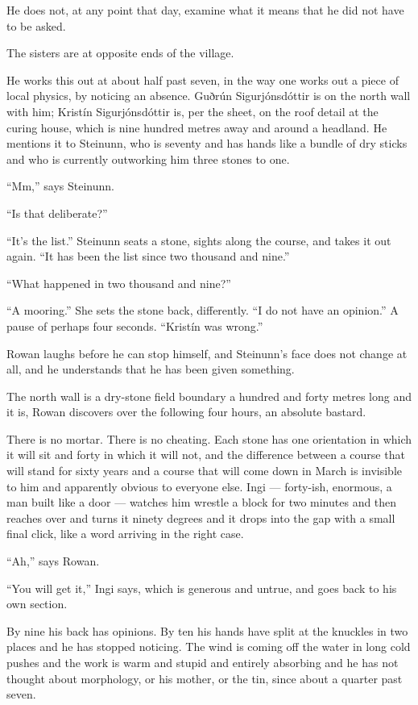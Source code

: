 \documentclass[11pt,oneside]{book}
\newcommand{\sceneline}{%
  \par\vspace{1.2em}
  \begin{center}
    \fontsize{11}{11}\selectfont \textbullet\quad\textbullet\quad\textbullet
  \end{center}
  \vspace{0.6em}\noindent\ignorespaces
}
\begin{document}
He does not, at any point that day, examine what it means that he did
not have to be asked.

\sceneline

The sisters are at opposite ends of the village.

He works this out at about half past seven, in the way one works out a
piece of local physics, by noticing an absence. Guðrún Sigurjónsdóttir
is on the north wall with him; Kristín Sigurjónsdóttir is, per the
sheet, on the roof detail at the curing house, which is nine hundred
metres away and around a headland. He mentions it to Steinunn, who is
seventy and has hands like a bundle of dry sticks and who is currently
outworking him three stones to one.

``Mm,'' says Steinunn.

``Is that deliberate?''

``It's the list.'' Steinunn seats a stone, sights along the course, and
takes it out again. ``It has been the list since two thousand and
nine.''

``What happened in two thousand and nine?''

``A mooring.'' She sets the stone back, differently. ``I do not have an
opinion.'' A pause of perhaps four seconds. ``Kristín was wrong.''

Rowan laughs before he can stop himself, and Steinunn's face does not
change at all, and he understands that he has been given something.

\sceneline

The north wall is a dry-stone field boundary a hundred and forty metres
long and it is, Rowan discovers over the following four hours, an
absolute bastard.

There is no mortar. There is no cheating. Each stone has one orientation
in which it will sit and forty in which it will not, and the difference
between a course that will stand for sixty years and a course that will
come down in March is invisible to him and apparently obvious to
everyone else. Ingi --- forty-ish, enormous, a man built like a door ---
watches him wrestle a block for two minutes and then reaches over and
turns it ninety degrees and it drops into the gap with a small final
click, like a word arriving in the right case.

``Ah,'' says Rowan.

``You will get it,'' Ingi says, which is generous and untrue, and goes
back to his own section.

By nine his back has opinions. By ten his hands have split at the
knuckles in two places and he has stopped noticing. The wind is coming
off the water in long cold pushes and the work is warm and stupid and
entirely absorbing and he has not thought about morphology, or his
mother, or the tin, since about a quarter past seven.
\end{document}
